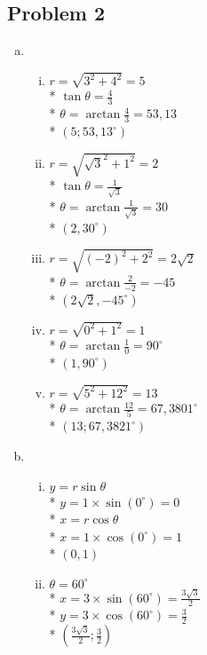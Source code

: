 \documentclass[a4paper]{article}
\begin{document}
  \subsection*{Problem 2}
  \begin{enumerate}[a)]
    \item 
    \begin{enumerate}[i.]
      \item $r = \sqrt{3^{2}+4^{2}} = 5$\\*
      $\tan \theta = \frac{4}{3}$\\* 
      $\theta = \arctan \frac{4}{3} = 53,13$\\*
      $(5;53,13^{\circ})$

      \item $r = \sqrt{\sqrt{3}^{2} + 1^{2}} = 2$\\*
      $\tan \theta = \frac{1}{\sqrt{3}}$\\*
      $\theta = \arctan \frac{1}{\sqrt{3}} = 30$\\*
      $(2,30^{\circ})$

      \item $r = \sqrt{(-2)^{2} + 2^{2}} = 2\sqrt{2}$\\*
      $\theta = \arctan \frac{2}{-2} = -45$\\*
      $(2\sqrt{2},-45^{\circ})$

      \item $r = \sqrt{0^{2} + 1^{2}} = 1$\\*
      $\theta = \arctan \frac{1}{0} = 90^{\circ}$\\*
      $(1,90^{\circ})$

      \item $r = \sqrt{5^{2} + 12^{2}} = 13$\\*
      $\theta = \arctan \frac{12}{5} = 67,3801^{\circ}$\\*
      $(13;67,3821^{\circ})$
    \end{enumerate}
    \item 
    \begin{enumerate}[vi.]
      \item $y = r \sin \theta$\\*
      $y = 1 \times \sin (0^{\circ}) = 0$\\*
      $x = r \cos \theta$\\*
      $x = 1 \times \cos (0^{\circ}) = 1$\\*
      $(0,1)$

      \item $\theta = 60^{\circ}$\\*
      $x = 3 \times \sin (60^{\circ}) = \frac{3\sqrt{3}}{2}$\\*
      $y = 3 \times \cos (60^{\circ}) = \frac{3}{2}$\\*
      $(\frac{3\sqrt{3}}{2};\frac{3}{2})$


\end{enumerate}
\end{enumerate}
\end{document}

